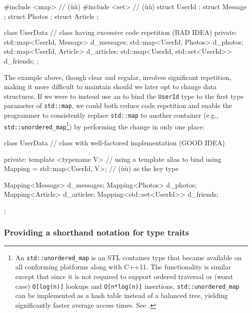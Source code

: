 \begin{emcppshiddenlisting}[emcppsbatch={e2,e3}]
#include <map>  // (ù{}ù)
#include <set>  // (ù{}ù)
struct UserId {};
struct Message {};
struct Photos {};
struct Article {};
\end{emcppshiddenlisting}
\begin{emcppslisting}[emcppsbatch=e2]
class UserData  // class having excessive code repetition (BAD IDEA)
{
private:
    std::map<UserId, Message>          d_messages;
    std::map<UserId, Photos>           d_photos;
    std::map<UserId, Article>          d_articles;
    std::map<UserId, std::set<UserId>> d_friends;
};
\end{emcppslisting}

\noindent The example above, though clear and regular, involves significant
repetition, making it more difficult to maintain should we later opt to
change data structures. If we were to instead use an  to bind the \lstinline!UserId! type to the first type
parameter of \lstinline!std::map!, we could both reduce code repetition
and enable the programmer to consistently replace \lstinline!std::map!
to another container
(e.g., \lstinline!std::unordered_map!{\cprotect\footnote{An
\lstinline!std::unordered_map! is an STL container type that became
available on all conforming platforms along with C++11. The
functionality is similar except that since it is not required to
support ordered traversal or (worst case) \lstinline!O[log(n)]! lookups
and \lstinline!O[n*log(n)]! insertions, \lstinline!std::unordered_map! can
be implemented as a hash table instead of a balanced tree, yielding
significantly faster average access times. See
  \cite{cpprefb}.}}) by performing the change in only
one place:

\begin{emcppslisting}[emcppsbatch=e3]
class UserData  // class with well-factored implementation (GOOD IDEA)
{
private:
    template <typename V>                  // using a template alias to bind
    using Mapping = std::map<UserId, V>;   // (ù{}ù) as the key type

    Mapping<Message>          d_messages;
    Mapping<Photos>           d_photos;
    Mapping<Article>          d_articles;
    Mapping<std::set<UserId>> d_friends;
};
\end{emcppslisting}


\subsubsection[Providing a shorthand notation for type traits]{Providing a shorthand notation for type traits}\label{providing-a-shorthand-notation-for-type-traits}

